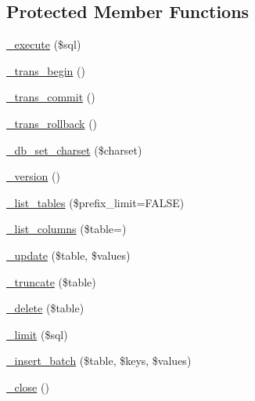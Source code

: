 \subsection*{Protected Member Functions}
\begin{DoxyCompactItemize}
\item 
\mbox{\hyperlink{class_c_i___d_b__mssql__driver_ae2b3d9a0f255e4d9f2f69283305869aa}{\+\_\+execute}} (\$sql)
\item 
\mbox{\hyperlink{class_c_i___d_b__mssql__driver_a97bae3e33f7508e09118df5aa8f70bc8}{\+\_\+trans\+\_\+begin}} ()
\item 
\mbox{\hyperlink{class_c_i___d_b__mssql__driver_a5a23831ee84e28b8e51387accc7baca3}{\+\_\+trans\+\_\+commit}} ()
\item 
\mbox{\hyperlink{class_c_i___d_b__mssql__driver_a923f7b22eced04314ce7368ef7aafaed}{\+\_\+trans\+\_\+rollback}} ()
\item 
\mbox{\hyperlink{class_c_i___d_b__mssql__driver_af43059199bfc445c5a84ca1fcfd12322}{\+\_\+db\+\_\+set\+\_\+charset}} (\$charset)
\item 
\mbox{\hyperlink{class_c_i___d_b__mssql__driver_ab5b2d5bd7bb7f73e06b7b84887b70624}{\+\_\+version}} ()
\item 
\mbox{\hyperlink{class_c_i___d_b__mssql__driver_a398b4a018852ce4bb8588fb0bdc5a074}{\+\_\+list\+\_\+tables}} (\$prefix\+\_\+limit=F\+A\+L\+SE)
\item 
\mbox{\hyperlink{class_c_i___d_b__mssql__driver_abd90cc6feb9ad6812724b30a83cd1d52}{\+\_\+list\+\_\+columns}} (\$table=\textquotesingle{}\textquotesingle{})
\item 
\mbox{\hyperlink{class_c_i___d_b__mssql__driver_a3fc17b1e8797b06c21ccb75fdb3d43c4}{\+\_\+update}} (\$table, \$values)
\item 
\mbox{\hyperlink{class_c_i___d_b__mssql__driver_a90385877323f193749fe162ca5e24a91}{\+\_\+truncate}} (\$table)
\item 
\mbox{\hyperlink{class_c_i___d_b__mssql__driver_a53342d0039ab3d66fb160942d5e2e7aa}{\+\_\+delete}} (\$table)
\item 
\mbox{\hyperlink{class_c_i___d_b__mssql__driver_a31b587edbc600206b737b109a803051c}{\+\_\+limit}} (\$sql)
\item 
\mbox{\hyperlink{class_c_i___d_b__mssql__driver_a01c5e753fee033215191c3bb42552245}{\+\_\+insert\+\_\+batch}} (\$table, \$keys, \$values)
\item 
\mbox{\hyperlink{class_c_i___d_b__mssql__driver_a4482d27f2b112a19a83b7f9c1af2054a}{\+\_\+close}} ()
\end{DoxyCompactItemize}
